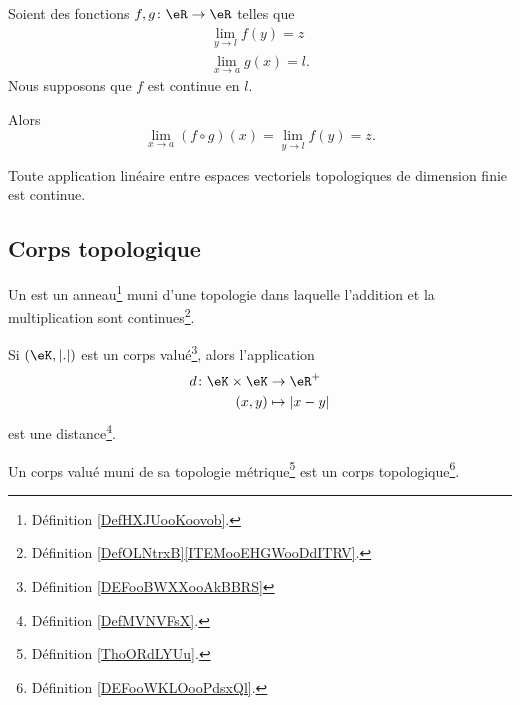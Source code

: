 \begin{proposition}       \label{PROPooKNVHooXlQyVA}
    Soient des fonctions \( f,g\colon \eR\to \eR\) telles que
    \begin{subequations}
        \begin{align}
            \lim_{y\to l} f(y)=z\\
            \lim_{x\to a} g(x)=l.
        \end{align}
    \end{subequations}
    Nous supposons que \( f\) est continue en \( l\).

    Alors
    \begin{equation}
        \lim_{x\to a} (f\circ g)(x)=\lim_{y\to l} f(y)=z.
    \end{equation}
\end{proposition}

\begin{proposition}     \label{PROPooBEHTooBrLWuh}
    Toute application linéaire entre espaces vectoriels topologiques de dimension finie est continue.
\end{proposition}

\subsection{Corps topologique}

\begin{definition}      \label{DEFooWKLOooPdsxQl}
	Un  est un anneau\footnote{Définition \ref{DefHXJUooKoovob}.} muni d'une topologie dans laquelle l'addition et la multiplication sont continues\footnote{Définition \ref{DefOLNtrxB}\ref{ITEMooEHGWooDdITRV}.}.
\end{definition}

\begin{propositionDef}      \label{PROPooAWAKooKRmbGT}
	Si \( (\eK, | . |)\) est un corps valué\footnote{Définition \ref{DEFooBWXXooAkBBRS}}, alors l'application
	\begin{equation}
		\begin{aligned}
			d\colon \eK\times \eK & \to \eR^+       \\
			(x,y)                 & \mapsto | x-y |
		\end{aligned}
	\end{equation}
	est une distance\footnote{Définition \ref{DefMVNVFsX}.}.

	Un corps valué muni de sa topologie métrique\footnote{Définition \ref{ThoORdLYUu}.} est un corps topologique\footnote{Définition \ref{DEFooWKLOooPdsxQl}.}.
\end{propositionDef}

